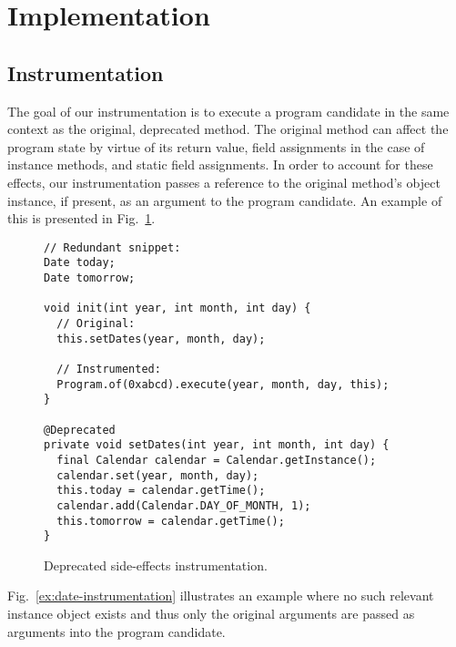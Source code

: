 \documentclass[runningheads,a4paper]{llncs}
\begin{document}




\section{Implementation}

\subsection{Instrumentation}

The goal of our instrumentation is to execute a program candidate in
the same context as the original, deprecated method. The original
method can affect the program state by virtue of its return value,
field assignments in the case of instance methods, and static field
assignments. In order to account for these effects, our
instrumentation passes a reference to the original method's object
instance, if present, as an argument to the program candidate.
An example of this is presented in
Fig.~\ref{ex:side-effects-instrumentation}.

\begin{figure}
\begin{lstlisting}[mathescape=true,showstringspaces=false]
// Redundant snippet:
Date today;
Date tomorrow;
  
void init(int year, int month, int day) {
  // Original:
  this.setDates(year, month, day);

  // Instrumented:
  Program.of(0xabcd).execute(year, month, day, this);
}
  
@Deprecated
private void setDates(int year, int month, int day) {
  final Calendar calendar = Calendar.getInstance();
  calendar.set(year, month, day);
  this.today = calendar.getTime();
  calendar.add(Calendar.DAY_OF_MONTH, 1);
  this.tomorrow = calendar.getTime();
}
\end{lstlisting}
\caption{Deprecated side-effects instrumentation.}
\label{ex:side-effects-instrumentation}
\end{figure}

Fig.~\ref{ex:date-instrumentation} illustrates an example where no
such relevant instance object exists and thus only the original
arguments are passed as arguments into the program candidate.
\end{document}
